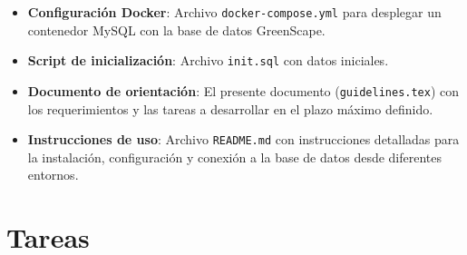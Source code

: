 \documentclass[10pt]{article}
\begin{document}
	\begin{itemize}
		\item \textbf{Configuración Docker}: Archivo \texttt{docker-compose.yml} para desplegar un contenedor MySQL con la base de datos GreenScape.
		
		\item \textbf{Script de inicialización}: Archivo \texttt{init.sql} con datos iniciales.
		
		\item \textbf{Documento de orientación}: El presente documento (\texttt{guidelines.tex}) con los requerimientos y las tareas a desarrollar en el plazo máximo definido.
		
		\item \textbf{Instrucciones de uso}: Archivo \texttt{README.md} con instrucciones detalladas para la instalación, configuración y conexión a la base de datos desde diferentes entornos.
	\end{itemize}
	
	\section*{Tareas}
	
\end{document}
